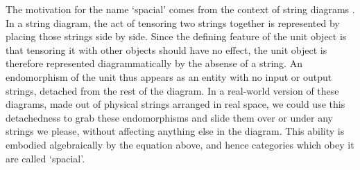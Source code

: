 \documentclass{amsart} %
\begin{document}
The motivation for the name `spacial' comes from the context of string diagrams \cite{graphicalmon}. In a string diagram, the act of tensoring two strings together is represented by placing those strings side by side. Since the defining feature of the unit object is that tensoring it with other objects should have no effect, the unit object is therefore represented diagrammatically by the absense of a string. An endomorphism of the unit thus appears as an entity with no input or output strings, detached from the rest of the diagram. In a real-world version of these diagrams, made out of physical strings arranged in real space, we could use this detachedness to grab these endomorphisms and slide them over or under any strings we please, without affecting anything else in the diagram. This ability is embodied algebraically by the equation above, and hence categories which obey it are called `spacial'.
\end{document}
